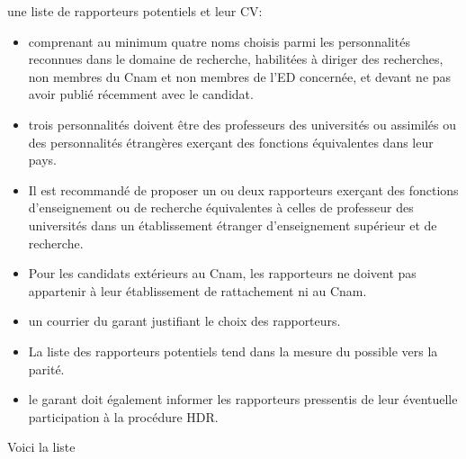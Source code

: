 \begin{consignes}
  une liste de rapporteurs potentiels et leur CV:
  \begin{itemize}
\item comprenant au minimum quatre noms choisis parmi les personnalités
  reconnues dans le domaine de recherche, habilitées à diriger des recherches, non
  membres du Cnam et non membres de l’ED concernée, et devant ne pas avoir
  publié récemment avec le candidat.
\item trois personnalités doivent être des professeurs des universités ou assimilés ou
  des personnalités étrangères exerçant des fonctions équivalentes dans leur pays.
\item Il est recommandé de proposer un ou deux rapporteurs exerçant des fonctions
  d’enseignement ou de recherche équivalentes à celles de professeur des
  universités dans un établissement étranger d’enseignement supérieur et de
  recherche.
\item Pour les candidats extérieurs au Cnam, les rapporteurs ne doivent pas appartenir
  à leur établissement de rattachement ni au Cnam.
\item un courrier du garant justifiant le choix des rapporteurs.
\item La liste des rapporteurs potentiels tend dans la mesure du possible vers la parité.
\item le garant doit également informer les rapporteurs pressentis de leur éventuelle
  participation à la procédure HDR.
  \end{itemize}
\end{consignes}

Voici la liste
